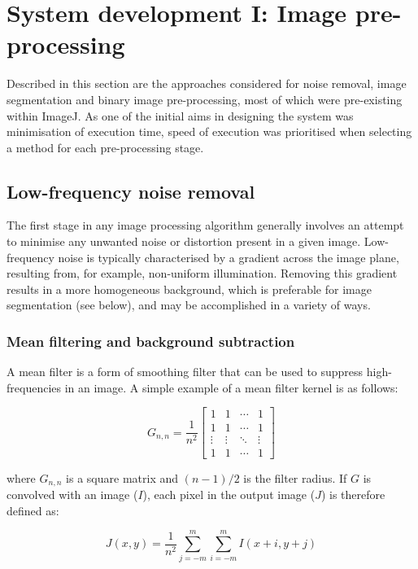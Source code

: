 \section{System development I: Image pre-processing}

Described in this section are the approaches considered for noise removal, image segmentation and binary image pre-processing, most of which were pre-existing within ImageJ. As one of the initial aims in designing the system was minimisation of execution time, speed of execution was prioritised when selecting a method for each pre-processing stage.

\subsection{Low-frequency noise removal}

The first stage in any image processing algorithm generally involves an attempt to minimise any unwanted noise or distortion present in a given image. Low-frequency noise is typically characterised by a gradient across the image plane, resulting from, for example, non-uniform illumination. Removing this gradient results in a more homogeneous background, which is preferable for image segmentation (see below), and may be accomplished in a variety of ways.

\subsubsection{Mean filtering and background subtraction}

A mean filter is a form of smoothing filter that can be used to suppress high-frequencies in an image. A simple example of a mean filter kernel is as follows:

\begin{equation}
	G_{n,n} = \frac{1}{n^2}
	 \begin{bmatrix}
	  1 & 1 & \cdots & 1 \\
	  1 & 1 & \cdots & 1 \\
	  \vdots  & \vdots  & \ddots & \vdots  \\
	  1 & 1 & \cdots & 1 
	 \end{bmatrix}
\end{equation}

\noindent where $G_{n,n}$ is a square matrix and $(n-1)/2$ is the filter radius. If $G$ is convolved with an image ($I$), each pixel in the output image ($J$) is therefore defined as:

\begin{equation}
	J(x,y) = \frac{1}{n^2}\sum^{m}_{j=-m}\sum^m_{i=-m}I(x+i,y+j)
\end{equation}

